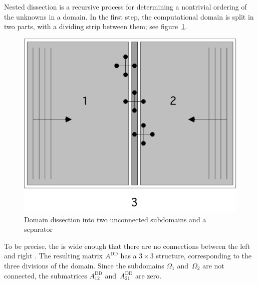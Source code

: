 Nested dissection is a recursive process for determining a nontrivial
ordering of the unknowns in a domain. In the first step, the
computational domain is split in two parts, with a dividing strip
between them; see figure~\ref{fig:domdecomp}.
\begin{figure}[ht]
  \includegraphics[scale=.1]{graphics-public/domdecomp}
  \caption{Domain dissection into two unconnected subdomains and a separator}
  \label{fig:domdecomp}
\end{figure}
\newcommand\Add{A^{\mathrm{DD}}}
To be precise, the  is wide enough that there are
no connections between the left and right . The resulting
matrix $\Add$ has a $3\times3$ structure, corresponding to the three
divisions of the domain. Since the subdomains $\Omega_1$
and~$\Omega_2$ are not connected, the submatrices $\Add_{12}$
and~$\Add_{21}$ are zero.
